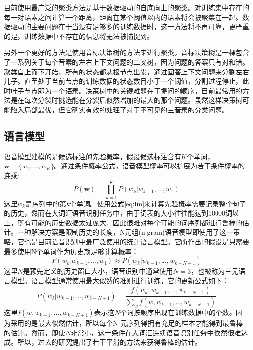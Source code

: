 目前使用最广泛的聚类方法是基于数据驱动的自底向上的聚类。对训练集中存在的每一对语素之间计算一个距离，距离在某个阈值以内的语素将会被聚集在一起。数据驱动的主要问题在于当没有足够多的训练数据时，这一方法将不再可靠，更严重的是，训练数据中不存在的信息将无法被捕捉到。

另外一个更好的方法是使用音标决策树的方法来进行聚类。音标决策树是一棵包含了一系列关于每个音素的左右上下文问题的二叉树，因为问题的答案只有对和错。聚类自上而下开始，所有的状态都从根节点出发，通过回答上下文问题来分割左右儿子。直至处于当前节点的训练数据的状态数目小于一个阈值，分割过程停止，此时叶子节点即为一个语素。决策树中的关键难题在于提问的顺序，目前最常用的方法是在每次分裂时挑选能在分裂后似然增加的最大的那个问题。虽然这样决策树可能陷入局部最优，但它确实有效的处理了对于不可见的三音素的分类问题。

\subsection{语言模型}
\label{sec:lm}
语音模型建模的是候选标注的先验概率，假设候选标注含有$K$个单词，$\mathbf{w}=\{w_1, \dots, w_K\}$。通过条件概率公式，语音模型概率可以扩展为若干条件概率的连乘:
\begin{equation}
    \label{eq:lm}
    P(\mathbf{w})=\prod_{k=1}^{K}P(w_k|w_{k-1}, ..., w_1)
\end{equation}
这里$w_k$是序列中的第$k$个单词。使用公式\ref{eq:lm}来计算先验概率需要记录整个句子的历史，然而在大词汇语音识别任务中，由于词表的大小往往能达到10000词以上，所有可能的历史数据太过庞大，因此很难对每个可能的词序列都进行鲁棒的估计。一种解决方案是限制历史的长度，N元组(n-gram)语音模型即使用了这一策略，它也是目前语音识别中最广泛使用的统计语言模型。它所作出的假设是只需要最多使用N个单词作为历史就足够计算概率：
\begin{equation}
    P(w_k|w_{k-1}, ..., w_1) \approx P(w_k|w_{k-1}, ..., w_{k-N+1})
\end{equation}
这里$N$是预先定义的历史窗口大小，语音识别中通常使用$N=3$，也被称为三元语言模型。语言模型通常使用最大似然的准则进行训练，它的更新公式如下：
\begin{equation}
    P(w_k|w_{k-1}, ..., w_{k-N+1})=\frac{f(w_k,w_{k-1},...,w_{k-N+1})}{\sum_wf(w,w_{k-1},...,w_{k-N+1})}
\end{equation}
这里$f(w,w_{k-1},...,w_{k-N+1})$表示这$N$个词按顺序出现在训练数据中的个数。因为采用的是最大似然估计，所以每个N-元序列得拥有充足的样本才能得到最鲁棒的估计。然而，即使$N$非常小，这一条件在大词汇连续语音识别任务中依然很难达成。所以，过去的研究提出了若干平滑的方法来获得鲁棒的估计。
